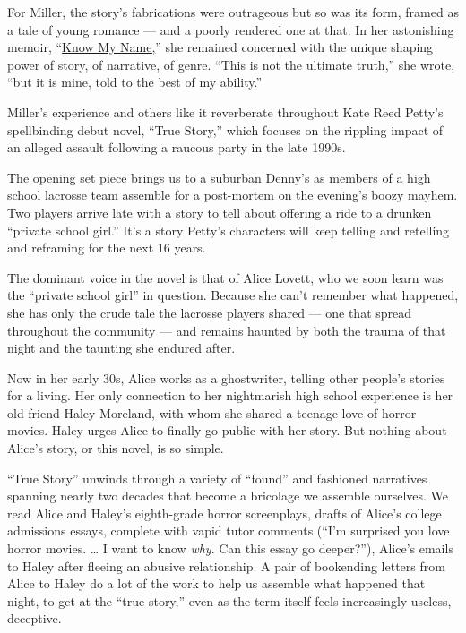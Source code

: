 For Miller, the story's fabrications were outrageous but so was its
form, framed as a tale of young romance --- and a poorly rendered one at
that. In her astonishing memoir,
``\href{https://www.nytimes.com/2019/09/24/books/review/chanel-miller-know-my-name.html}{Know
My Name,}'' she remained concerned with the unique shaping power of
story, of narrative, of genre. ``This is not the ultimate truth,'' she
wrote, ``but it is mine, told to the best of my ability.''

Miller's experience and others like it reverberate throughout Kate Reed
Petty's spellbinding debut novel, ``True Story,'' which focuses on the
rippling impact of an alleged assault following a raucous party in the
late 1990s.

The opening set piece brings us to a suburban Denny's as members of a
high school lacrosse team assemble for a post-mortem on the evening's
boozy mayhem. Two players arrive late with a story to tell about
offering a ride to a drunken ``private school girl.'' It's a story
Petty's characters will keep telling and retelling and reframing for the
next 16 years.

The dominant voice in the novel is that of Alice Lovett, who we soon
learn was the ``private school girl'' in question. Because she can't
remember what happened, she has only the crude tale the lacrosse players
shared --- one that spread throughout the community --- and remains
haunted by both the trauma of that night and the taunting she endured
after.

Now in her early 30s, Alice works as a ghostwriter, telling other
people's stories for a living. Her only connection to her nightmarish
high school experience is her old friend Haley Moreland, with whom she
shared a teenage love of horror movies. Haley urges Alice to finally go
public with her story. But nothing about Alice's story, or this novel,
is so simple.

``True Story'' unwinds through a variety of ``found'' and fashioned
narratives spanning nearly two decades that become a bricolage we
assemble ourselves. We read Alice and Haley's eighth-grade horror
screenplays, drafts of Alice's college admissions essays, complete with
vapid tutor comments (``I'm surprised you love horror movies. \ldots{} I
want to know \emph{why}. Can this essay go deeper?''), Alice's emails to
Haley after fleeing an abusive relationship. A pair of bookending
letters from Alice to Haley do a lot of the work to help us assemble
what happened that night, to get at the ``true story,'' even as the term
itself feels increasingly useless, deceptive.

